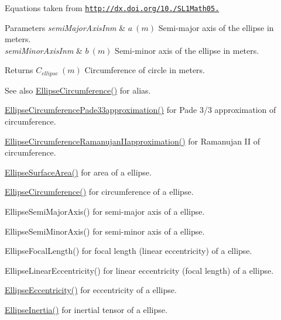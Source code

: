 Equations taken from \href{http://dx.doi.org/10.3247/SL1Math05.004}{\tt http\+://dx.\+doi.\+org/10./\+S\+L1\+Math05.} 
\begin{DoxyParams}{Parameters}
{\em semi\+Major\+Axis\+Inm} & $ a\ (m)$ Semi-\/major axis of the ellipse in meters. \\
\hline
{\em semi\+Minor\+Axis\+Inm} & $ b\ (m)$ Semi-\/minor axis of the ellipse in meters. \\
\hline
\end{DoxyParams}
\begin{DoxyReturn}{Returns}
$ C_{ellipse}\ (m)$ Circumference of circle in meters. 
\end{DoxyReturn}
\begin{DoxySeeAlso}{See also}
\mbox{\hyperlink{group___e_g_x_math-_geometry-2_d-_ellipse-_circumference_ga4172802ac674eb53467b44928ac635c7}{Ellipse\+Circumference()}} for alias. 

\mbox{\hyperlink{group___e_g_x_math-_geometry-2_d-_ellipse-_circumference_ga0e0b290f1da2605c16ec13b9e221769d}{Ellipse\+Circumference\+Pade33approximation()}} for Pade 3/3 approximation of circumference. 

\mbox{\hyperlink{group___e_g_x_math-_geometry-2_d-_ellipse-_circumference_gaa908406db81fadc7c2d73e4e113d24d7}{Ellipse\+Circumference\+Ramanujan\+I\+Iapproximation()}} for Ramanujan II of circumference. 

\mbox{\hyperlink{group___e_g_x_math-_geometry-2_d-_ellipse-_surface_area_ga4ce8c8323e9718ce5458f4ab7f6d823d}{Ellipse\+Surface\+Area()}} for area of a ellipse. 

\mbox{\hyperlink{group___e_g_x_math-_geometry-2_d-_ellipse-_circumference_ga4172802ac674eb53467b44928ac635c7}{Ellipse\+Circumference()}} for circumference of a ellipse. 

Ellipse\+Semi\+Major\+Axis() for semi-\/major axis of a ellipse. 

Ellipse\+Semi\+Minor\+Axis() for semi-\/minor axis of a ellipse. 

Ellipse\+Focal\+Length() for focal length (linear eccentricity) of a ellipse. 

Ellipse\+Linear\+Eccentricity() for linear eccentricity (focal length) of a ellipse. 

\mbox{\hyperlink{group___e_g_x_math-_geometry-2_d-_ellipse-_eccentricity_ga6a0a7fba17f782616894cfc447628c33}{Ellipse\+Eccentricity()}} for eccentricity of a ellipse. 

\mbox{\hyperlink{group___e_g_x_math-_geometry-2_d-_ellipse-_inertia_ga10a3049c2f04b50f271fb01dc62e4cf8}{Ellipse\+Inertia()}} for inertial tensor of a ellipse. 
\end{DoxySeeAlso}
